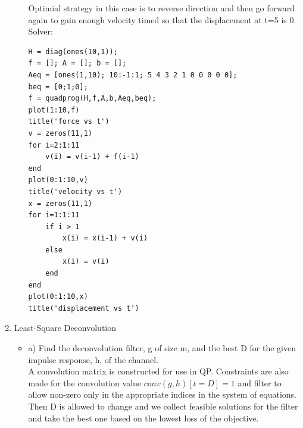 \documentclass[12pt,letter]{article}
\begin{document}
\begin{enumerate}
\begin{itemize}
\begin{figure}[H]
    \end{figure}
    Optimial strategy in this case is to reverse direction and then go forward again to gain enough velocity timed so that the displacement at t=5 is 0.\\    
    Solver:
\begin{verbatim}
H = diag(ones(10,1));
f = []; A = []; b = [];
Aeq = [ones(1,10); 10:-1:1; 5 4 3 2 1 0 0 0 0 0];
beq = [0;1;0];
f = quadprog(H,f,A,b,Aeq,beq);
plot(1:10,f)
title('force vs t')
v = zeros(11,1)
for i=2:1:11
    v(i) = v(i-1) + f(i-1)
end
plot(0:1:10,v)
title('velocity vs t')
x = zeros(11,1)
for i=1:1:11
    if i > 1
        x(i) = x(i-1) + v(i)
    else
        x(i) = v(i)
    end
end
plot(0:1:10,x)
title('displacement vs t')
\end{verbatim}

  \end{itemize}

  \pagebreak
  
\item Least-Square Deconvolution\\
  
  
  \begin{itemize}
  \item a) Find the deconvolution filter, g of size m, and the best D for the given impulse response, h, of the channel.\\

    A convolution matrix is constructed for use in QP. Constraints are also made for the convolution value $conv(g,h)[t=D]=1$ and filter to allow non-zero only in the appropriate indices in the system of equations. Then D is allowed to change and we collect feasible solutions for the filter and take the best one based on the lowest loss of the objective.\\


\end{itemize}
\end{enumerate}
\end{document}
